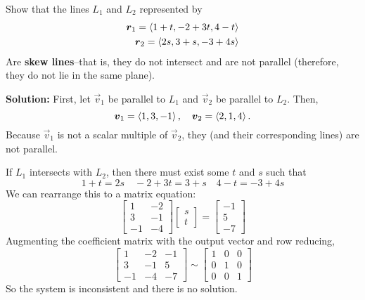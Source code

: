 \begin{example}
    Show that the lines \(L_1\) and \(L_2\) represented by 
    \begin{align*}
        \boldsymbol{r}_1 = \left\langle1+t, -2+3t, 4-t\right\rangle \\
        \boldsymbol{r}_2 = \left\langle2s, 3+s, -3+4s\right\rangle
    \end{align*}
    Are \textbf{skew lines}--that is, they do not intersect and are not parallel (therefore, they do not lie in the same plane).\par
    \textbf{Solution:} First, let \(\vec v_1\) be parallel to \(L_1\) and \(\vec v_2\) be parallel to \(L_2\). Then,
    \[\boldsymbol{v}_1 = \left\langle1, 3, -1\right\rangle,\quad \boldsymbol{v}_2=\left\langle2,1,4\right\rangle.\]
    Because \(\vec v_1\) is not a scalar multiple of \(\vec v_2\), they  (and their corresponding lines) are not parallel. \par
    If \(L_1\) intersects with \(L_2\), then there must exist some \(t\) and \(s\) such that
    \[1+t=2s \quad -2+3t=3+s\quad 4-t=-3+4s\]
    We can rearrange this to a matrix equation:
    \[ \begin{bmatrix}
        1 & -2 \\
        3 & -1 \\
        -1 & -4 
    \end{bmatrix}\begin{bmatrix}
        s \\ t
    \end{bmatrix}=\begin{bmatrix}
        -1 \\ 5 \\ -7
    \end{bmatrix} \]
    Augmenting the coefficient matrix with the output vector and row reducing,
    \[ \begin{bmatrix}
        1 & -2 & -1\\
        3 & -1 & 5\\
        -1 & -4  & -7
    \end{bmatrix}\sim \begin{bmatrix}
        1 & 0 & 0\\
        0 & 1 & 0 \\
        0 & 0 & 1
    \end{bmatrix} \]
    So the system is inconsistent and there is no solution.
\end{example}
